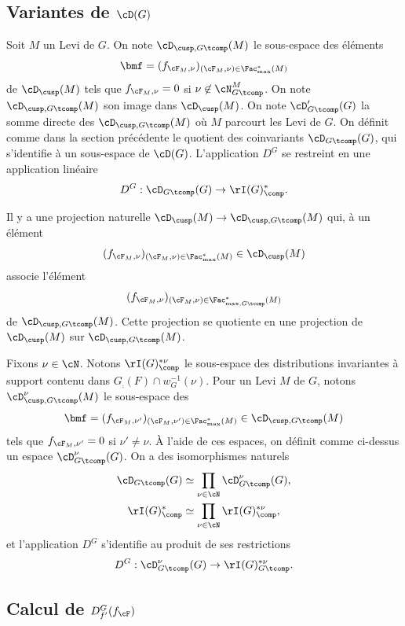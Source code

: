 \subsection{Variantes de \texorpdfstring{$\cD(G)$}{DG}}\label{variantes}
Soit $M$ un Levi de $G$. On note $\boldsymbol{\cD}_{\cusp,G\tcomp}(M)$ le sous-espace des éléments
\[
\bmf=(f_{\cF_{M},\nu})_{(\cF_{M},\nu)\in \Fac^*_{\max}(M)}
\]
de $ \boldsymbol{\cD}_{\cusp}(M)$ tels que $f_{\cF_{M},\nu}=0$ si $\nu\not\in \cN^M_{G\tcomp}$. On note $\cD_{\cusp,G\tcomp}(M)$ son image dans $\cD_{\cusp}(M)$. On note $\cD'_{G\tcomp}(G)$ la somme directe des $\cD_{\cusp,G\tcomp}(M)$ où $M$ parcourt les Levi de $G$. On définit comme dans la section précédente le quotient des coinvariants $\cD_{G\tcomp}(G)$, qui s'identifie à un sous-espace de $\cD(G)$. L'application $D^G$ se restreint en une application linéaire
\[
D^G:\cD_{G\tcomp}(G)\to \rI(G)^*_{\comp}.
\]

Il y a une projection naturelle $\boldsymbol{\cD}_{\cusp}(M)\to \boldsymbol{\cD}_{\cusp,G\tcomp}(M)$ qui, à un élément
\[
(f_{\cF_{M},\nu})_{(\cF_{M},\nu)\in \Fac^*_{\max}(M)}\in \boldsymbol{\cD}_{\cusp}(M)
\]
associe l'élément
\[
(f_{\cF_{M},\nu})_{(\cF_{M},\nu)\in \Fac^*_{\max,G\tcomp}(M)}
\]
de $ \boldsymbol{\cD}_{\cusp,G\tcomp}(M)$. Cette projection se quotiente en une projection de $\cD_{\cusp}(M)$ sur $\cD_{\cusp,G\tcomp}(M)$.

Fixons $\nu\in \cN$. Notons $\rI(G)^{*\nu}_{\comp}$ le sous-espace des distributions invariantes à support contenu dans $G_{\comp}(F)\cap w_{G}^{-1}(\nu)$. Pour un Levi $M$ de $G$, notons $\boldsymbol{\cD}^{\nu}_{\cusp,G\tcomp}(M)$ le sous-espace des
\[
\bmf=(f_{\cF_{M},\nu'})_{(\cF_{M},\nu')\in \Fac^*_{\max}(M)}\in \boldsymbol{\cD}_{\cusp,G\tcomp}(M)
\]
tels que $f_{\cF_{M},\nu'}=0$ si $\nu'\neq\nu$. À l'aide de ces espaces, on définit comme ci-dessus un espace $\cD^{\nu}_{G\tcomp}(G)$. On a des isomorphismes naturels
\begin{align*}
\cD_{G\tcomp}(G)&\simeq \prod_{\nu\in \cN}\cD_{G\tcomp}^{\nu}(G),
\\
\rI(G)^*_{\comp}&\simeq \prod_{\nu\in \cN}\rI(G)^{*\nu}_{\comp},
\end{align*}
et l'application $D^G$ s'identifie au produit de ses restrictions
\[
D^G:\cD_{G\tcomp}^{\nu}(G)\to \rI(G)^{*\nu}_{G\tcomp}.
\]

\subsection{Calcul de \texorpdfstring{$D_{f'}^G(f_{\cF})$}{DGf}}\label{calcul}

